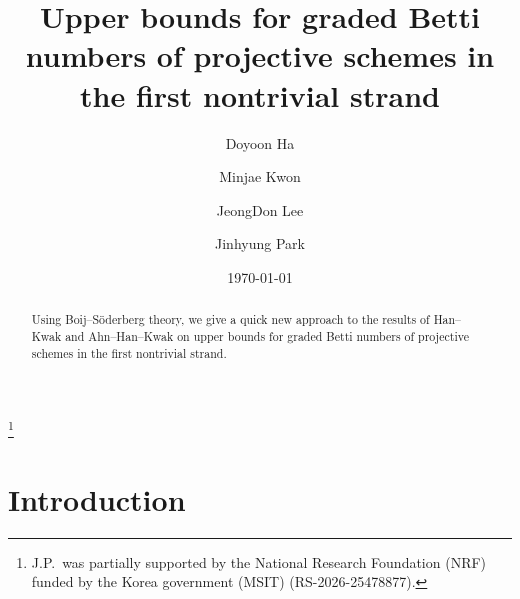 \documentclass[12pt]{amsart}
\title[Upper bounds for graded Betti numbers]{Upper bounds for graded Betti numbers of projective schemes in the first nontrivial strand}
\theoremstyle{definition}
\theoremstyle{remark}
\theoremstyle{corollary}
\theoremstyle{theorem}
\theoremstyle{corollary}
\theoremstyle{corollary}
\theoremstyle{definition}
\theoremstyle{remark}
\numberwithin{equation}{section}
\begin{document}
\newcommand{\kaistaddress}{Department of Mathematical Sciences, KAIST, 291 Daehak-ro, Yuseond-gu, Daejeon 34141, Republic of Korea}

\author{Doyoon Ha}
\address{\kaistaddress}

\author{Minjae Kwon}
\address{\kaistaddress}

\author{JeongDon Lee}
\address{\kaistaddress}

\author{Jinhyung Park}
\address{\kaistaddress}



\date{\today}

\thanks{J.P.~was partially supported by the National Research Foundation (NRF) funded by the Korea government (MSIT) (RS-2026-25478877).}




\begin{abstract}
Using Boij--S\"{o}derberg theory, we give a quick new approach to the results of Han--Kwak \cite{HK} and Ahn--Han--Kwak \cite{AHK} on upper bounds for graded Betti numbers of projective schemes in the first nontrivial strand. 
\end{abstract}


\maketitle

\section{Introduction}
\end{document}
